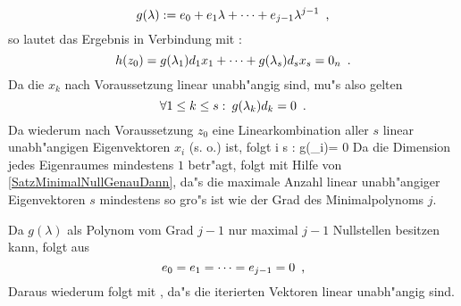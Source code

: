\[
   g(\lambda):= e_0 + e_1 \lambda + \cdots + e_{j-1} \lambda^{j-1} \mbox{\hspace{0.5em},}
\]
so lautet das Ergebnis in Verbindung mit  :
\[
    h(z_0)= g(\lambda_1) d_1 x_1 + \cdots + g(\lambda_s) d_s x_s
          = 0_n \mbox{\hspace{0.5em}.}
\]
Da die $x_k$ nach Voraussetzung linear unabh"angig sind, mu"s also gelten
\[ \forall 1 \leq k \leq s :\: g(\lambda_k)d_k = 0 \mbox{\hspace{0.5em}.} \]
Da wiederum nach Voraussetzung $z_0$ eine Linearkombination aller $s$
linear unabh"angigen Eigenvektoren $x_i$ (s. o.) ist, folgt
     \leq i \leq s :\: g(\lambda_i)= 0 \MyPunkt
\Eeq
Da die Dimension jedes Eigenraumes mindestens $1$ betr"agt, folgt mit Hilfe
von \ref{SatzMinimalNullGenauDann}, da"s
die maximale Anzahl linear unabh"angiger Eigenvektoren $s$ mindestens
so gro"s ist wie der Grad des Minimalpolynoms $j$.

Da $g(\lambda)$ als Polynom vom Grad $j-1$
nur maximal $j-1$ Nullstellen besitzen kann, folgt aus 
\[ e_0 = e_1 = \cdots = e_{j-1} = 0 \mbox{\hspace{0.5em},} \]
Daraus wiederum folgt mit ,
da"s die iterierten Vektoren linear unabh"angig sind.

